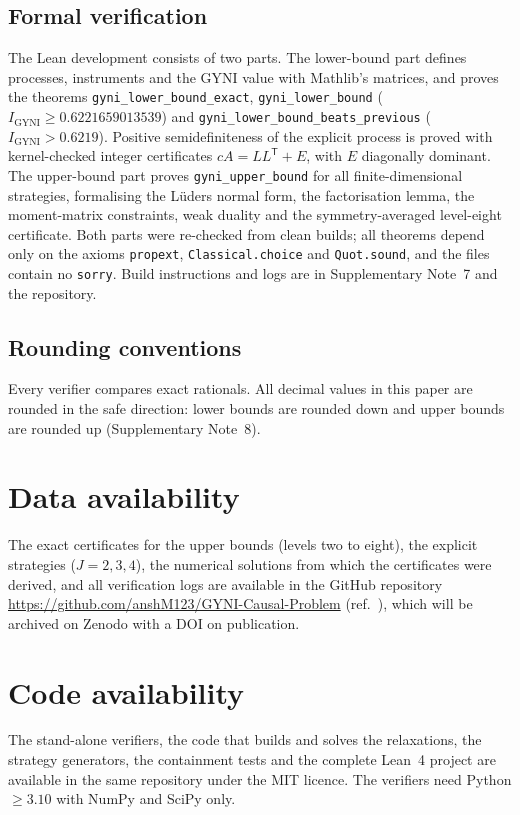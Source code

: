 \documentclass[11pt]{article}
\newcommand{\tp}{\mathsf{T}}
\newcommand{\Igy}{I_{\mathrm{GYNI}}}
\begin{document}
\subsection*{Formal verification}
The Lean development consists of two parts. The lower-bound part defines processes, instruments and the GYNI value with Mathlib's matrices, and proves the theorems \texttt{gyni\_lower\_\allowbreak bound\_\allowbreak exact}, \texttt{gyni\_lower\_\allowbreak bound} ($\Igy\ge0.6221659013539$) and \texttt{gyni\_lower\_\allowbreak bound\_\allowbreak beats\_\allowbreak previous} ($\Igy>0.6219$). Positive semidefiniteness of the explicit process is proved with kernel-checked integer certificates $cA=LL^{\tp}+E$, with $E$ diagonally dominant. The upper-bound part proves \texttt{gyni\_upper\_bound} for all finite-dimensional strategies, formalising the L\"uders normal form, the factorisation lemma, the moment-matrix constraints, weak duality and the symmetry-averaged level-eight certificate. Both parts were re-checked from clean builds; all theorems depend only on the axioms \texttt{propext}, \texttt{Classical.choice} and \texttt{Quot.sound}, and the files contain no \texttt{sorry}. Build instructions and logs are in Supplementary Note~7 and the repository\cite{repo}.

\subsection*{Rounding conventions}
Every verifier compares exact rationals. All decimal values in this paper are rounded in the safe direction: lower bounds are rounded down and upper bounds are rounded up (Supplementary Note~8).

\section*{Data availability}
The exact certificates for the upper bounds (levels two to eight), the explicit strategies ($J=2,3,4$), the numerical solutions from which the certificates were derived, and all verification logs are available in the GitHub repository \url{https://github.com/anshM123/GYNI-Causal-Problem} (ref.~), which will be archived on Zenodo with a DOI on publication.

\section*{Code availability}
The stand-alone verifiers, the code that builds and solves the relaxations, the strategy generators, the containment tests and the complete Lean~4 project are available in the same repository\cite{repo} under the MIT licence. The verifiers need Python $\ge3.10$ with NumPy and SciPy only.
\end{document}
